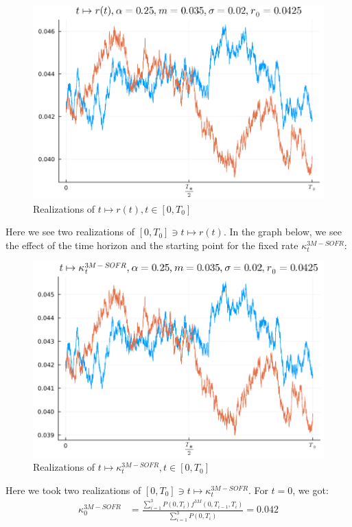 \begin{figure}[htp]
    \centering
    \includegraphics[width=12cm]{figures/SOFR/Vasicek_realizations.PNG}
    \caption{Realizations of $t \mapsto r(t), t \in [0,T_{0}]$}
    \label{fig: Vasicek_paths}
\end{figure}

Here we see two realizations of $[0,T_{0}] \ni t \mapsto r(t)$. In the graph below, we see the effect of the time horizon and the starting point for the fixed rate $\kappa_{t}^{3M-SOFR}$:


\begin{figure}[htp]
    \centering
    \includegraphics[width=12cm]{figures/SOFR/3M_SOFR_swap_rate_Vasicek.PNG}
    \caption{Realizations of $t \mapsto \kappa_{t}^{3M-SOFR}, t \in [0,T_{0}]$}
    \label{fig: 3M_SOFR_swap_rate}
\end{figure}

Here we took two realizations of $[0,T_{0}] \ni t \mapsto \kappa_{t}^{3M-SOFR}$. For $t=0$, we got: 
\begin{align*}
\kappa_{0}^{3M-SOFR} &= 
\frac{
\sum_{i=1}^{3}P(0,T_{i})f^{3M}(0,T_{i-1}, T_{i})
}{
\sum_{i=1}^{3}P(0,T_{i})
}
= 
0.042
\end{align*}





